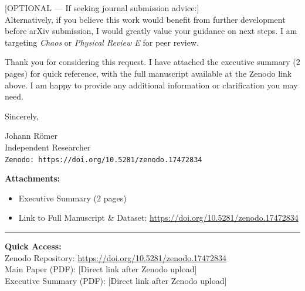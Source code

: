 \documentclass[11pt,a4paper]{article}
\begin{document}
[OPTIONAL — If seeking journal submission advice:]\\
Alternatively, if you believe this work would benefit from further development before arXiv submission, I would greatly value your guidance on next steps. I am targeting \textit{Chaos} or \textit{Physical Review E} for peer review.

\vspace{0.5em}

Thank you for considering this request. I have attached the executive summary (2 pages) for quick reference, with the full manuscript available at the Zenodo link above. I am happy to provide any additional information or clarification you may need.

\vspace{1em}

Sincerely,

\vspace{2em}

Johann Römer\\
Independent Researcher\\
\texttt{Zenodo: https://doi.org/10.5281/zenodo.17472834}

\vspace{2em}

\textbf{Attachments:}
\begin{itemize}
\item Executive Summary (2 pages)
\item Link to Full Manuscript \& Dataset: \url{https://doi.org/10.5281/zenodo.17472834}
\end{itemize}

\vspace{2em}
\hrule
\vspace{0.5em}

\begin{center}
\small
\textbf{Quick Access:}\\
Zenodo Repository: \url{https://doi.org/10.5281/zenodo.17472834}\\
Main Paper (PDF): [Direct link after Zenodo upload]\\
Executive Summary (PDF): [Direct link after Zenodo upload]
\end{center}
\end{document}
